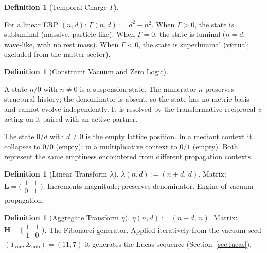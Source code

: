 \documentclass[11pt,letterpaper]{article}
\theoremstyle{plain}
\theoremstyle{definition}
\newtheorem{definition}[theorem]{Definition}
\theoremstyle{remark}
\newcommand{\lop}{\lambda}
\newcommand{\aop}{\eta}
\newcommand{\Tcharge}{\Gamma}
\newcommand{\Sigimb}{\Sigma_{\mathrm{imb}}}
\newcommand{\Tvac}{T_{\mathrm{vac}}}
\begin{document}
\begin{definition}[Temporal Charge $\Tcharge$]\label{def:tcharge}
\begin{rsbox}
For a linear ERP $(n,d)$:
$\Tcharge(n,d):=d^2-n^2$. When $\Tcharge>0$, the state is subluminal (massive, particle-like). When $\Tcharge=0$, the state is luminal ($n=d$; wave-like, with no rest mass). When $\Tcharge<0$, the state is superluminal (virtual; excluded from the matter sector).
\end{rsbox}
\end{definition}

\begin{definition}[Constraint Vacuum and Zero Logic]\label{def:cv}
\begin{rsbox}
A state $n/0$ with $n\neq0$ is a suspension state.  The numerator
$n$ preserves structural history; the denominator is absent, so the
state has no metric basis and cannot evolve independently.  It is
resolved by the transformative reciprocal $\psi$ acting on it paired
with an active partner.

The state $0/d$ with $d\neq0$ is the empty lattice position.  In a
mediant context it collapses to $0/0$ (empty); in a multiplicative
context to $0/1$ (empty).  Both represent the same emptiness
encountered from different propagation contexts.
\end{rsbox}
\end{definition}

\begin{definition}[Linear Transform $\lop$]\label{def:lop}
$\lop(n,d):=(n+d,\,d)$.
Matrix: $\mathbf{L}=\bigl(\begin{smallmatrix}1&1\\0&1
\end{smallmatrix}\bigr)$.  Increments magnitude; preserves denominator.
Engine of vacuum propagation.
\end{definition}

\begin{definition}[Aggregate Transform $\aop$]\label{def:aop}
$\aop(n,d):=(n+d,\,n)$.
Matrix: $\mathbf{H}=\bigl(\begin{smallmatrix}1&1\\1&0
\end{smallmatrix}\bigr)$.  The Fibonacci generator.  Applied
iteratively from the vacuum seed $(\Tvac,\Sigimb)=(11,7)$ it
generates the Lucas sequence (Section~\ref{sec:lucas}).
\end{definition}
\end{document}
